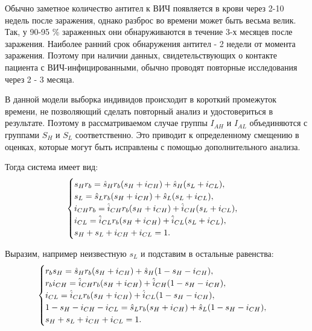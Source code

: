 \documentclass[a4paper]{report}
\begin{document}
	Обычно заметное количество антител к ВИЧ появляется в крови через 2-10 недель после заражения, однако разброс во времени может быть весьма велик. Так, у 90-95 \% зараженных они обнаруживаются в течение 3-х месяцев после заражения. Наиболее ранний срок обнаружения антител - 2 недели от момента заражения. Поэтому при наличии данных, свидетельствующих о контакте пациента с ВИЧ-инфицированными, обычно проводят повторные исследования через 2 - 3 месяца.
	
	В данной модели выборка индивидов происходит в короткий промежуток времени, не позволяющий сделать повторный анализ и удостовериться в результате. Поэтому в рассматриваемом случае группы $I_{AH}$ и $I_{AL}$ объединяются с группами $S_H$ и $S_L$ соответственно. 
	Это приводит к определенному смещению в оценках, которые могут быть исправлены с помощью дополнительного анализа.
	
	Тогда система имеет вид:
	\begin{gather}
	\begin{cases}
	s_H r_b	= \hat{s}_H r_b (s_H +i_{CH}) + \hat{s}_H(s_L +i_{CL}), \notag \\
	s_L	= \hat{s}_L r_b (s_H +i_{CH}) + \hat{s}_L(s_L +i_{CL}), \notag \\
	i_{CH} r_b	= \hat{i}_{CH} r_b (s_H +i_{CH}) + \hat{i}_{CH}(s_L +i_{CL}),  \notag \\
	i_{CL} = \hat{i}_{CL} r_b (s_H + i_{CH}) + \hat{i}_{CL}(s_L +i_{CL}),  \notag \\
	s_H + s_L + i_{CH} + i_{CL} = 1. \notag
	\end{cases}
	\end{gather}
	
	Выразим, например неизвестную $s_L$ и подставим в остальные равенства:
	\begin{gather}
	\begin{cases}
	r_b s_H = \hat{s}_H r_b (s_H +i_{CH}) + \hat{s}_H(1 - s_H - i_{CH}), \notag \\
	r_b i_{CH}	= \hat{i}_{CH} r_b (s_H +i_{CH}) + \hat{i}_{CH}(1 - s_H - i_{CH}),  \notag \\
	i_{CL} = \hat{i}_{CL} r_b (s_H + i_{CH}) + \hat{i}_{CL}(1 - s_H - i_{CH}),  \notag \\
	1 - s_H - i_{CH} - i_{CL}	= \hat{s}_L r_b (s_H +i_{CH}) + \hat{s}_L(1 - s_H - i_{CH}), \notag \\
	s_H + s_L + i_{CH} + i_{CL} = 1. \notag
	\end{cases}
	\end{gather}
	
\end{document}
